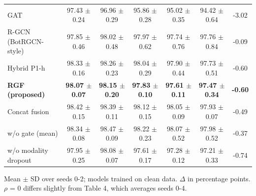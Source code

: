 \begin{table}[!t]
\begin{tabular}{lcccccc}
GAT & 97.43 $\pm$ 0.24 & 96.96 $\pm$ 0.29 & 95.86 $\pm$ 0.28 & 95.02 $\pm$ 0.35 & 94.42 $\pm$ 0.64 & -3.02 \\
R-GCN (BotRGCN-style) & 97.85 $\pm$ 0.46 & 98.02 $\pm$ 0.48 & 97.97 $\pm$ 0.62 & 97.74 $\pm$ 0.76 & 97.76 $\pm$ 0.84 & -0.09 \\
Hybrid P1-h & 98.33 $\pm$ 0.16 & 98.26 $\pm$ 0.23 & 98.04 $\pm$ 0.29 & 97.90 $\pm$ 0.44 & 97.73 $\pm$ 0.51 & -0.60 \\
\textbf{RGF (proposed)} & \textbf{98.07 $\pm$ 0.07} & \textbf{98.15 $\pm$ 0.20} & \textbf{97.83 $\pm$ 0.10} & \textbf{97.61 $\pm$ 0.11} & \textbf{97.47 $\pm$ 0.34} & \textbf{-0.60} \\
Concat fusion & 98.42 $\pm$ 0.15 & 98.39 $\pm$ 0.11 & 98.12 $\pm$ 0.15 & 98.05 $\pm$ 0.09 & 97.93 $\pm$ 0.07 & -0.49 \\
w/o gate (mean) & 98.34 $\pm$ 0.08 & 98.47 $\pm$ 0.09 & 98.22 $\pm$ 0.23 & 98.07 $\pm$ 0.52 & 97.98 $\pm$ 0.52 & -0.37 \\
w/o modality dropout & 97.95 $\pm$ 0.25 & 98.08 $\pm$ 0.07 & 97.61 $\pm$ 0.17 & 97.28 $\pm$ 0.12 & 97.21 $\pm$ 0.33 & -0.74 \\
\hline
\end{tabular}
\par\smallskip\parbox{\linewidth}{\scriptsize Mean $\pm$ SD over seeds 0-2; models trained on clean data. $\Delta$ in percentage points. $\rho$ = 0 differs slightly from Table 4, which averages seeds 0-4.}
\end{table}

